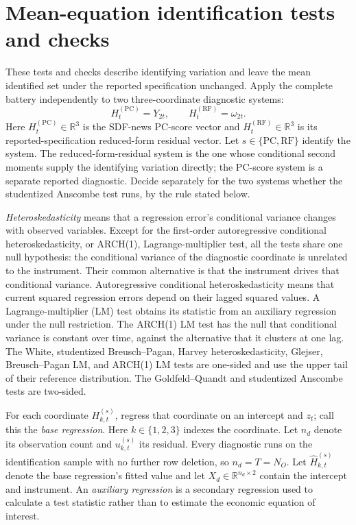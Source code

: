 \documentclass[11pt]{article}
\begin{document}
\section{Mean-equation identification tests and checks}
\label{sec:mean-diagnostics}

These tests and checks describe identifying variation and leave the mean identified set
under the reported specification unchanged. Apply the complete battery independently to two
three-coordinate diagnostic systems:
\[
 H_t^{(\mathrm{PC})}=Y_{2t},\qquad H_t^{(\mathrm{RF})}=\omega_{2t}.
\]
Here \(H_t^{(\mathrm{PC})}\in\mathbb R^3\) is the SDF-news PC-score vector and
\(H_t^{(\mathrm{RF})}\in\mathbb R^3\) is its reported-specification reduced-form residual vector.
Let \(s\in\{\mathrm{PC},\mathrm{RF}\}\) identify the system. The reduced-form-residual system is the
one whose conditional second moments supply the identifying variation directly; the
PC-score system is a separate reported diagnostic. Decide separately for the two systems whether the
studentized Anscombe test runs, by the rule stated below.

\emph{Heteroskedasticity} means that a regression error's conditional variance changes with observed
variables. Except for the first-order autoregressive conditional heteroskedasticity, or ARCH(1),
Lagrange-multiplier test, all the tests share one null hypothesis: the conditional variance of the
diagnostic coordinate is unrelated to the instrument. Their common alternative is that the
instrument drives that conditional variance. Autoregressive conditional heteroskedasticity means
that current squared regression errors depend on their lagged squared values. A
Lagrange-multiplier (LM) test obtains its statistic from an auxiliary regression under
the null restriction. The ARCH(1) LM test
has the null that conditional variance is constant over time, against the alternative that it
clusters at one lag. The White, studentized Breusch--Pagan, Harvey heteroskedasticity, Glejser,
Breusch--Pagan LM, and ARCH(1) LM tests are one-sided and use the upper tail of their reference
distribution. The
Goldfeld--Quandt and studentized Anscombe tests are two-sided.

For each coordinate \(H_{k,t}^{(s)}\), regress that coordinate on an intercept and \(z_t\); call this
the \emph{base regression}. Here \(k\in\{1,2,3\}\) indexes the coordinate. Let \(n_d\) denote its
observation count and \(u_{k,t}^{(s)}\) its residual. Every diagnostic runs on the identification
sample with no further row deletion, so \(n_d=T=N_O\). Let \(\widehat H_{k,t}^{(s)}\) denote the
base regression's fitted value and let \(X_d\in\mathbb R^{n_d\times2}\) contain the intercept and
instrument. An \emph{auxiliary regression} is a secondary regression used to calculate a test
statistic rather than to estimate the economic equation of interest.
\end{document}
